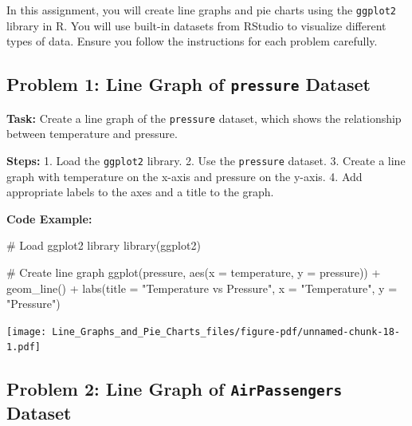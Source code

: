 \documentclass[
  letterpaper,
  DIV=11,
  numbers=noendperiod]{scrreprt}
\newenvironment{Shaded}{\begin{snugshade}}{\end{snugshade}}
\newcommand{\AttributeTok}[1]{\textcolor[rgb]{0.40,0.45,0.13}{#1}}
\newcommand{\CommentTok}[1]{\textcolor[rgb]{0.37,0.37,0.37}{#1}}
\newcommand{\FunctionTok}[1]{\textcolor[rgb]{0.28,0.35,0.67}{#1}}
\newcommand{\NormalTok}[1]{\textcolor[rgb]{0.00,0.23,0.31}{#1}}
\newcommand{\SpecialCharTok}[1]{\textcolor[rgb]{0.37,0.37,0.37}{#1}}
\newcommand{\StringTok}[1]{\textcolor[rgb]{0.13,0.47,0.30}{#1}}
\begin{document}

In this assignment, you will create line graphs and pie charts using the
\texttt{ggplot2} library in R. You will use built-in datasets from
RStudio to visualize different types of data. Ensure you follow the
instructions for each problem carefully.

\subsection*{\texorpdfstring{Problem 1: Line Graph of \texttt{pressure}
Dataset}{Problem 1: Line Graph of pressure Dataset}}\label{problem-1-line-graph-of-pressure-dataset}

\textbf{Task:} Create a line graph of the \texttt{pressure} dataset,
which shows the relationship between temperature and pressure.

\textbf{Steps:} 1. Load the \texttt{ggplot2} library. 2. Use the
\texttt{pressure} dataset. 3. Create a line graph with temperature on
the x-axis and pressure on the y-axis. 4. Add appropriate labels to the
axes and a title to the graph.

\textbf{Code Example:}

\begin{Shaded}
\begin{Highlighting}[]
\CommentTok{\# Load ggplot2 library}
\FunctionTok{library}\NormalTok{(ggplot2)}

\CommentTok{\# Create line graph}
\FunctionTok{ggplot}\NormalTok{(pressure, }\FunctionTok{aes}\NormalTok{(}\AttributeTok{x =}\NormalTok{ temperature, }\AttributeTok{y =}\NormalTok{ pressure)) }\SpecialCharTok{+}
  \FunctionTok{geom\_line}\NormalTok{() }\SpecialCharTok{+}
  \FunctionTok{labs}\NormalTok{(}\AttributeTok{title =} \StringTok{"Temperature vs Pressure"}\NormalTok{,}
       \AttributeTok{x =} \StringTok{"Temperature"}\NormalTok{,}
       \AttributeTok{y =} \StringTok{"Pressure"}\NormalTok{)}
\end{Highlighting}
\end{Shaded}

\texttt{[image: Line\_Graphs\_and\_Pie\_Charts\_files/figure-pdf/unnamed-chunk-18-1.pdf]}

\subsection*{\texorpdfstring{Problem 2: Line Graph of
\texttt{AirPassengers}
Dataset}{Problem 2: Line Graph of AirPassengers Dataset}}\label{problem-2-line-graph-of-airpassengers-dataset}
\end{document}
